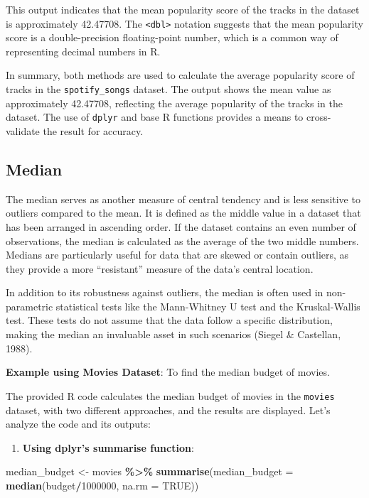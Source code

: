 \documentclass[
]{book}
\newenvironment{Shaded}{\begin{snugshade}}{\end{snugshade}}
\newcommand{\AttributeTok}[1]{\textcolor[rgb]{0.13,0.29,0.53}{#1}}
\newcommand{\ConstantTok}[1]{\textcolor[rgb]{0.56,0.35,0.01}{#1}}
\newcommand{\DecValTok}[1]{\textcolor[rgb]{0.00,0.00,0.81}{#1}}
\newcommand{\FunctionTok}[1]{\textcolor[rgb]{0.13,0.29,0.53}{\textbf{#1}}}
\newcommand{\NormalTok}[1]{#1}
\newcommand{\OtherTok}[1]{\textcolor[rgb]{0.56,0.35,0.01}{#1}}
\newcommand{\SpecialCharTok}[1]{\textcolor[rgb]{0.81,0.36,0.00}{\textbf{#1}}}
\providecommand{\tightlist}{%
  \setlength{\itemsep}{0pt}\setlength{\parskip}{0pt}}
\begin{document}
This output indicates that the mean popularity score of the tracks in the dataset is approximately 42.47708. The \texttt{\textless{}dbl\textgreater{}} notation suggests that the mean popularity score is a double-precision floating-point number, which is a common way of representing decimal numbers in R.

In summary, both methods are used to calculate the average popularity score of tracks in the \texttt{spotify\_songs} dataset. The output shows the mean value as approximately 42.47708, reflecting the average popularity of the tracks in the dataset. The use of \texttt{dplyr} and base R functions provides a means to cross-validate the result for accuracy.

\subsection*{Median}\label{median}

The median serves as another measure of central tendency and is less sensitive to outliers compared to the mean. It is defined as the middle value in a dataset that has been arranged in ascending order. If the dataset contains an even number of observations, the median is calculated as the average of the two middle numbers. Medians are particularly useful for data that are skewed or contain outliers, as they provide a more ``resistant'' measure of the data's central location.

In addition to its robustness against outliers, the median is often used in non-parametric statistical tests like the Mann-Whitney U test and the Kruskal-Wallis test. These tests do not assume that the data follow a specific distribution, making the median an invaluable asset in such scenarios (Siegel \& Castellan, 1988).

\textbf{Example using Movies Dataset}: To find the median budget of movies.

The provided R code calculates the median budget of movies in the \texttt{movies} dataset, with two different approaches, and the results are displayed. Let's analyze the code and its outputs:

\begin{enumerate}
\def\labelenumi{\arabic{enumi}.}
\tightlist
\item
  \textbf{Using dplyr's summarise function}:
\end{enumerate}

\begin{Shaded}
\begin{Highlighting}[]
\NormalTok{median\_budget }\OtherTok{\textless{}{-}}\NormalTok{ movies }\SpecialCharTok{\%\textgreater{}\%}
  \FunctionTok{summarise}\NormalTok{(}\AttributeTok{median\_budget =} \FunctionTok{median}\NormalTok{(budget}\SpecialCharTok{/}\DecValTok{1000000}\NormalTok{, }\AttributeTok{na.rm =} \ConstantTok{TRUE}\NormalTok{))}
\end{Highlighting}
\end{Shaded}
\end{document}
